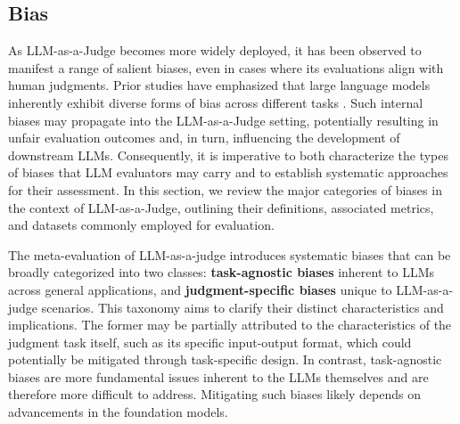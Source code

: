 \documentclass[acmsmall,screen]{acmart}
\begin{document}




\subsection{Bias}
\label{Evaluation:Bias}
As LLM-as-a-Judge becomes more widely deployed, it has been observed to manifest a range of salient biases, even in cases where its evaluations align with human judgments. Prior studies have emphasized that large language models inherently exhibit diverse forms of bias across different tasks \citep{biassurvey, dai2024unifying, tan-etal-2024-blinded}. 
Such internal biases may propagate into the LLM-as-a-Judge setting, potentially resulting in unfair evaluation outcomes and, in turn, influencing the development of downstream LLMs. 
Consequently, it is imperative to both characterize the types of biases that LLM evaluators may carry and to establish systematic approaches for their assessment. 
In this section, we review the major categories of biases in the context of LLM-as-a-Judge, outlining their definitions, associated metrics, and datasets commonly employed for evaluation.

The meta-evaluation of  LLM-as-a-judge introduces systematic biases that can be broadly categorized into two classes: \textbf{task-agnostic biases} inherent to LLMs across general applications, and \textbf{judgment-specific biases} unique to LLM-as-a-judge scenarios. 
This taxonomy aims to clarify their distinct characteristics and implications.
The former may be partially attributed to the characteristics of the judgment task itself, such as its specific input-output format, which could potentially be mitigated through task-specific design. 
In contrast, task-agnostic biases are more fundamental issues inherent to the LLMs themselves and are therefore more difficult to address. Mitigating such biases likely depends on advancements in the foundation models.
\end{document}
